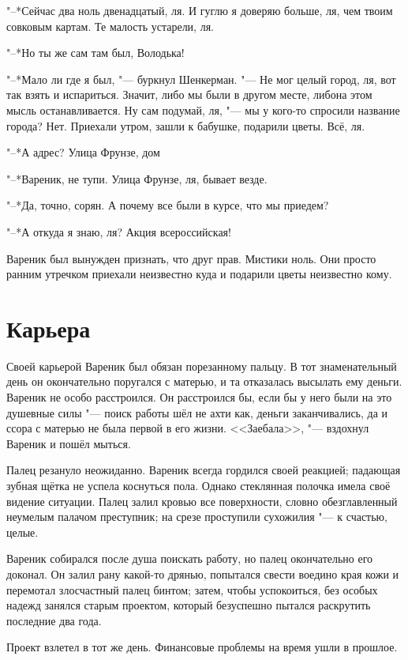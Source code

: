 "--*Сейчас два ноль двенадцатый, ля.
И гуглю я доверяю больше, ля, чем твоим совковым картам.
Те малость устарели, ля.

"--*Но ты же сам там был, Володька!

"--*Мало ли где я был, "--- буркнул Шенкерман.
"--- Не мог целый город, ля, вот так взять и испариться. 
Значит, либо мы были в другом месте, либо\ldotst на этом мысль останавливается. 
Ну сам подумай, ля, "--- мы у кого-то спросили название города?
Нет.
Приехали утром, зашли к бабушке, подарили цветы.
Всё, ля.

"--*А адрес?
Улица Фрунзе, дом\ldotst

"--*Вареник, не тупи.
Улица Фрунзе, ля, бывает везде.

"--*Да, точно, сорян.
А почему все были в курсе, что мы приедем?

"--*А откуда я знаю, ля?
Акция всероссийская!

Вареник был вынужден признать, что друг прав.
Мистики ноль. 
Они просто ранним утречком приехали неизвестно куда и подарили цветы неизвестно кому.

\section{Карьера}

Своей карьерой Вареник был обязан порезанному пальцу.
В тот знаменательный день он окончательно поругался с матерью, и та отказалась высылать ему деньги.
Вареник не особо расстроился.
Он расстроился бы, если бы у него были на это душевные силы "--- поиск работы шёл не ахти как, деньги заканчивались, да и ссора с матерью не была первой в его жизни.
<<Заебала>>, "--- вздохнул Вареник и пошёл мыться.

Палец резануло неожиданно.
Вареник всегда гордился своей реакцией;
падающая зубная щётка не успела коснуться пола.
Однако стеклянная полочка имела своё видение ситуации.
Палец залил кровью все поверхности, словно обезглавленный неумелым палачом преступник;
на срезе проступили сухожилия "--- к счастью, целые.

Вареник собирался после душа поискать работу, но палец окончательно его доконал. 
Он залил рану какой-то дрянью, попытался свести воедино края кожи и перемотал злосчастный палец бинтом;
затем, чтобы успокоиться, без особых надежд занялся старым проектом, который безуспешно пытался раскрутить последние два года.

Проект взлетел в тот же день.
Финансовые проблемы на время ушли в прошлое.

